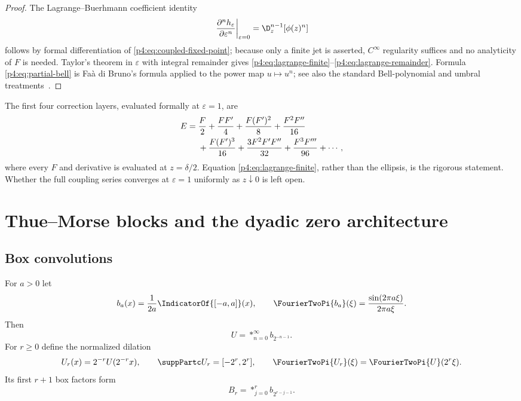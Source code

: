 \documentclass[11pt]{article}
\numberwithin{equation}{section}
\theoremstyle{definition}
\theoremstyle{remark}
\begin{document}
\begin{proof}
The Lagrange--Buerhmann coefficient identity
\[
 \left.\frac{\partial^n h_\varepsilon}{\partial\varepsilon^n}\right|_{\varepsilon=0}
 =\D_z^{n-1}[\phi(z)^n]
\]
follows by formal differentiation of \eqref{p4:eq:coupled-fixed-point}; because only a finite jet is asserted, $C^\infty$ regularity suffices and no analyticity of $F$ is needed.  Taylor's theorem in $\varepsilon$ with integral remainder gives \eqref{p4:eq:lagrange-finite}--\eqref{p4:eq:lagrange-remainder}.  Formula \eqref{p4:eq:partial-bell} is Fa\`a di Bruno's formula applied to the power map $u\mapsto u^n$; see also the standard Bell-polynomial and umbral treatments~\cite{p4:comtet,p4:roman}.
\end{proof}

The first four correction layers, evaluated formally at $\varepsilon=1$, are
\begin{align}
 E
={}&\frac F2+\frac{FF'}4
 +\frac{F(F')^2}{8}+\frac{F^2F''}{16}
 \notag\\
 &+\frac{F(F')^3}{16}
  +\frac{3F^2F'F''}{32}
  +\frac{F^3F'''}{96}+\cdots,
 \label{p4:eq:inverse-bell-first}
\end{align}
where every $F$ and derivative is evaluated at $z=\delta/2$.  Equation \eqref{p4:eq:lagrange-finite}, rather than the ellipsis, is the rigorous statement.  Whether the full coupling series converges at $\varepsilon=1$ uniformly as $z\downarrow0$ is left open.

\section{Thue--Morse blocks and the dyadic zero architecture}
\label{p4:sec:zero-architecture}

\subsection{Box convolutions}
For $a>0$ let
\begin{equation}
 b_a(x)=\frac1{2a}\IndicatorOf{[-a,a]}(x),
 \qquad \FourierTwoPi{b_a}(\xi)=\frac{\sin(2\pi a\xi)}{2\pi a\xi}.
 \label{p4:eq:box}
\end{equation}
Then
\begin{equation}
 U=*_{n=0}^{\infty}b_{2^{-n-1}}.
 \label{p4:eq:up-box-convolution}
\end{equation}
For $r\ge0$ define the normalized dilation
\begin{equation}
 U_r(x)=2^{-r}U(2^{-r}x),
 \qquad \suppPartc U_r=[-2^r,2^r],
 \qquad \FourierTwoPi{U_r}(\xi)=\FourierTwoPi{U}(2^r\xi).
 \label{p4:eq:Ur}
\end{equation}
Its first $r+1$ box factors form
\begin{equation}
 B_r=*_{j=0}^{r}b_{2^{r-j-1}}.
 \label{p4:eq:Br}
\end{equation}
\end{document}
